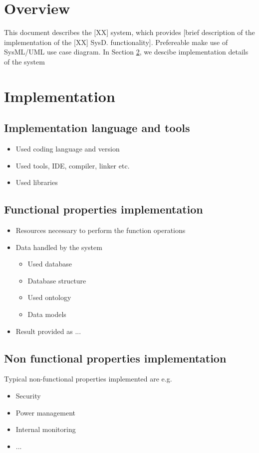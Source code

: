 \documentclass[a4paper]{arrowhead}
\begin{document}
\section{Overview}
\label{sec:overview}
\color{red}
This document describes the [XX] system, which provides [brief
description of the implementation of the [XX] SysD.
functionality]. Prefereable make use of SysML/UML 
use case diagram. 
\color{black}
In Section \ref{Implementation}, we descibe implementation details of
the system



\newpage

\section{Implementation}
\label{Implementation}

\subsection {Implementation language and tools}
\color{red}
\begin{itemize}
\item Used coding language and version
\item Used tools, IDE, compiler, linker etc.
\item Used libraries
\end{itemize} 
\color{black}

\subsection {Functional properties implementation}
\color{red}
  \begin{itemize}
  \item Resources necessary to perform the function operations
  \item Data handled by the system
    \begin{itemize}
    \item Used database
    \item Database structure
    \item Used ontology
    \item Data models
    \end{itemize}
  \item Result provided as ...
  \end{itemize}
\color{black}

\subsection {Non functional properties implementation}
\color{red}
Typical non-functional properties implemented are e.g.
\begin{itemize}
\item Security
\item Power management
\item Internal monitoring
\item ...
\end{itemize}  
\end{document}
